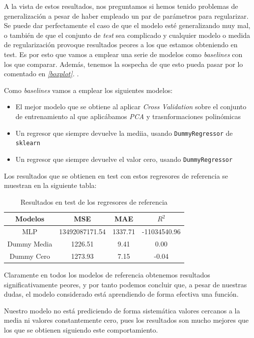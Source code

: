 \documentclass[11pt]{article}
\begin{document}
A la vista de estos resultados, nos preguntamos si hemos tenido problemas de generalización a pesar de haber empleado un par de parámetros para regularizar. Se puede dar perfectamente el caso de que el modelo esté generalizando muy mal, o también de que el conjunto de \emph{test} sea complicado y cualquier modelo o medida de regularización provoque resultados peores a los que estamos obteniendo en test. Es por esto que vamos a emplear una serie de modelos como \emph{baselines} con los que comparar. Además, tenemos la sospecha de que esto pueda pasar por lo comentado en \emph{\ref{boxplot}. }.

Como \emph{baselines} vamos a emplear los siguientes modelos:

\begin{itemize}
  \item El mejor modelo que se obtiene al aplicar \emph{Cross Validation} sobre el conjunto de entrenamiento al que aplicábamos \emph{PCA} y trasnformaciones polinómicas
  \item Un regresor que siempre devuelve la mediia, usando \lstinline{DummyRegressor} de \lstinline{sklearn}
  \item Un regresor que siempre devuelve el valor cero, usando \lstinline{DummyRegressor}
\end{itemize}

Los resultados que se obtienen en test con estos regresores de referencia se muestran en la siguiente tabla:

\begin{table}[H]
  \centering
  \begin{tabular}{|c|c|c|c|}
  \hline
  \textbf{Modelos}  & \textbf{MSE} & \textbf{MAE} & \textbf{$R^2$} \\
  \hline
  MLP  & 13492087171.54  & 1337.71 & -11034540.96 \\
  Dummy Media   & 1226.51 & 9.41 & 0.00 \\
  Dummy Cero & 1273.93 & 7.15 & -0.04 \\
  \hline
  \end{tabular}
  \caption{Resultados en test de los regresores de referencia}
\end{table}

Claramente en todos los modelos de referencia obtenemos resultados significativamente peores, y por tanto podemos concluir que, a pesar de nuestras dudas, el modelo considerado está aprendiendo de forma efectiva una función.

Nuestro modelo no está prediciendo de forma sistemática valores cercanos a la media ni valores constantemente cero, pues los resultados son mucho mejores que los que se obtienen siguiendo este comportamiento. 
\end{document}
